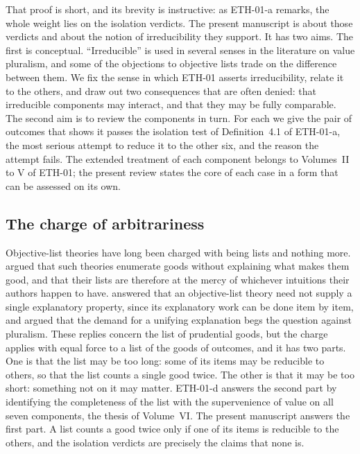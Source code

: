 \documentclass{situationist-preprint}
\begin{document}
That proof is short, and its brevity is instructive: as ETH-01-a remarks, the whole weight lies on the isolation verdicts. The present manuscript is about those verdicts and about the notion of irreducibility they support. It has two aims. The first is conceptual. \enquote{Irreducible} is used in several senses in the literature on value pluralism, and some of the objections to objective lists trade on the difference between them. We fix the sense in which ETH-01 asserts irreducibility, relate it to the others, and draw out two consequences that are often denied: that irreducible components may interact, and that they may be fully comparable. The second aim is to review the components in turn. For each we give the pair of outcomes that shows it passes the isolation test of Definition~4.1 of ETH-01-a, the most serious attempt to reduce it to the other six, and the reason the attempt fails. The extended treatment of each component belongs to Volumes~II to V of ETH-01; the present review states the core of each case in a form that can be assessed on its own.

\subsection{The charge of arbitrariness}

Objective-list theories have long been charged with being lists and nothing more. \citet[ch.~3]{Sumner1996} argued that such theories enumerate goods without explaining what makes them good, and that their lists are therefore at the mercy of whichever intuitions their authors happen to have. \citet{Fletcher2013} answered that an objective-list theory need not supply a single explanatory property, since its explanatory work can be done item by item, and \citet{Rice2013} argued that the demand for a unifying explanation begs the question against pluralism. These replies concern the list of prudential goods, but the charge applies with equal force to a list of the goods of outcomes, and it has two parts. One is that the list may be too long: some of its items may be reducible to others, so that the list counts a single good twice. The other is that it may be too short: something not on it may matter. ETH-01-d answers the second part by identifying the completeness of the list with the supervenience of value on all seven components, the thesis of Volume~VI. The present manuscript answers the first part. A list counts a good twice only if one of its items is reducible to the others, and the isolation verdicts are precisely the claims that none is.
\end{document}
